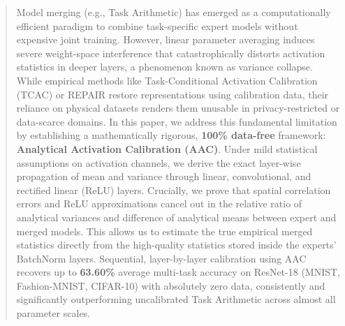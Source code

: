 \documentclass{article}
\theoremstyle{plain}
\theoremstyle{definition}
\theoremstyle{remark}
\begin{document}

\printAffiliationsAndNotice{}

\begin{abstract}
Model merging (e.g., Task Arithmetic) has emerged as a computationally efficient paradigm to combine task-specific expert models without expensive joint training. However, linear parameter averaging induces severe weight-space interference that catastrophically distorts activation statistics in deeper layers, a phenomenon known as variance collapse. While empirical methods like Task-Conditional Activation Calibration (TCAC) or REPAIR restore representations using calibration data, their reliance on physical datasets renders them unusable in privacy-restricted or data-scarce domains. In this paper, we address this fundamental limitation by establishing a mathematically rigorous, \textbf{100\% data-free} framework: \textbf{Analytical Activation Calibration (AAC)}. Under mild statistical assumptions on activation channels, we derive the exact layer-wise propagation of mean and variance through linear, convolutional, and rectified linear (ReLU) layers. Crucially, we prove that spatial correlation errors and ReLU approximations cancel out in the relative ratio of analytical variances and difference of analytical means between expert and merged models. This allows us to estimate the true empirical merged statistics directly from the high-quality statistics stored inside the experts' BatchNorm layers. Sequential, layer-by-layer calibration using AAC recovers up to \textbf{63.60\%} average multi-task accuracy on ResNet-18 (MNIST, Fashion-MNIST, CIFAR-10) with absolutely zero data, consistently and significantly outperforming uncalibrated Task Arithmetic across almost all parameter scales.
\end{abstract}
\end{document}
